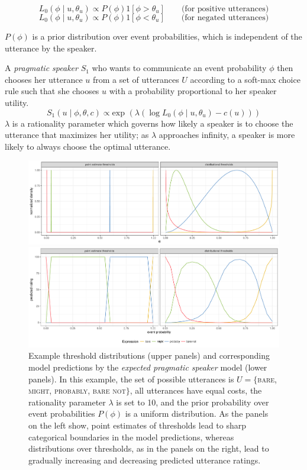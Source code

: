 \documentclass[lucida,biblatex]{sp} %
\renewcommand{\exp}{\text{exp }}
\begin{document}
$$L_0\left(\phi \mid u, \theta_u\right) \propto P(\phi) 1\left[\phi > \theta_u \right] \qquad \mbox{(for positive utterances)}$$
$$L_0\left(\phi \mid u, \theta_u\right) \propto P(\phi) 1\left[\phi < \theta_u \right] \qquad \mbox{(for negated utterances)}$$

$P(\phi)$ is a prior distribution over event probabilities, which is independent of the utterance by the speaker.


A \textit{pragmatic speaker} $S_1$ who wants to communicate an event probability $\phi$ then chooses her utterance $u$ from a set of utterances $U$ according to a soft-max choice rule \cite{Luce1959,SuttonBarto} such that she chooses $u$ with a probability proportional to her speaker utility. 
$$S_1\left(u \mid \phi, \theta, c\right) \propto \exp \left( \lambda \left( \log L_0\left(\phi \mid u, \theta_u\right)  - c(u)\right)\right)$$
$\lambda$ is a rationality parameter which governs how likely a speaker is to choose the utterance that maximizes her utility; as $\lambda$ approaches infinity, a speaker is more likely to always choose the optimal utterance.  


\begin{figure}
\includegraphics[width=\textwidth]{plots/model-visualization-distributions.pdf}

\includegraphics[width=\textwidth]{plots/model-visualization-predictions.pdf}

\caption{Example threshold distributions (upper panels) and corresponding model predictions by the \textit{expected pragmatic speaker} model (lower panels). In this example, the set of possible utterances is $U=\{$\textsc{bare}, \textsc{might}, \textsc{probably}, \textsc{bare not}$\}$, all utterances have equal costs, the rationality parameter $\lambda$ is set to 10, and the prior probability over event probabilities $P(\phi)$ is a uniform distribution. As the panels on the left show, point estimates of thresholds lead to sharp categorical boundaries in the model predictions, whereas distributions over thresholds, as in the panels on the right, lead to gradually increasing and decreasing predicted utterance ratings. \label{fig:model-visualization}}
\end{figure}
\end{document}
